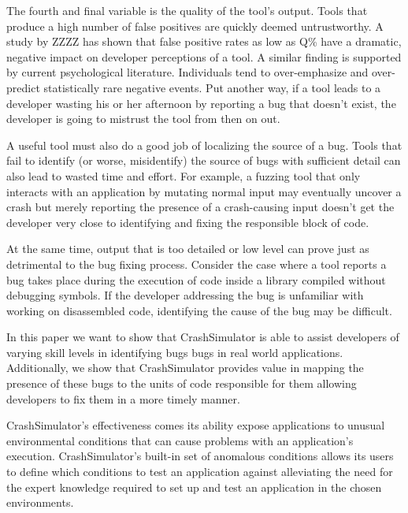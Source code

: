 
The fourth and final variable is the quality of the tool's output.  Tools
that produce a high number of false positives are quickly deemed
untrustworthy.  A study by ZZZZ has shown that false positive rates as low
as Q\% have a dramatic, negative impact on developer perceptions of a tool.
  A similar finding is supported by current psychological
literature.  Individuals tend to over-emphasize and over-predict
statistically rare negative events.  Put another way, if a
tool leads to a developer wasting his or her afternoon by reporting a bug
that doesn't exist, the developer is going to mistrust the tool from then
on out.

A useful tool must also do a good job of localizing the source of a bug.
Tools that fail to identify (or worse, misidentify) the source of bugs with
sufficient detail can also lead to wasted time and effort.  For example, a
fuzzing tool that only interacts with an application by mutating normal
input may eventually uncover a crash but merely reporting the presence of a
crash-causing input doesn't get the developer very close to identifying and
fixing the responsible block of code.

At the same time, output that is too detailed or low level can prove just
as detrimental to the bug fixing process.  Consider the case where a tool
reports a bug takes place during the execution of code inside a library
compiled without debugging symbols.  If the developer addressing the bug is
unfamiliar with working on disassembled code, identifying the cause of the
bug may be difficult.

In this paper we want to show that CrashSimulator is able to assist
developers of varying skill levels in identifying bugs bugs in real world
applications.  Additionally, we show that CrashSimulator provides value in
mapping the presence of these bugs to the units of code responsible for
them allowing developers to fix them in a more timely manner.

CrashSimulator's effectiveness comes its ability expose applications to
unusual environmental conditions that can cause problems with an
application's execution.  CrashSimulator's built-in set of anomalous
conditions allows its users to define which conditions to test an
application against alleviating the need for the expert knowledge required
to set up and test an application in the chosen environments.

